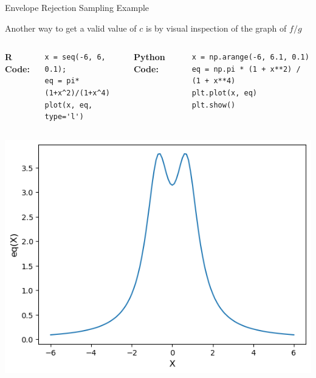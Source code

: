 \documentclass[8pt]{beamer}
\begin{document}
\begin{frame}[fragile]{Envelope Rejection Sampling Example}

Another way to get a valid value of $c$ is by visual inspection of the graph of $f/g$

\vspace{2mm}

\begin{columns}
{\bf R Code:}
\begin{lstlisting}
x = seq(-6, 6, 0.1);
eq = pi*(1+x^2)/(1+x^4)
plot(x, eq, type='l')
\end{lstlisting}

{\bf Python Code:}
\begin{lstlisting}
x = np.arange(-6, 6.1, 0.1)
eq = np.pi * (1 + x**2) / (1 + x**4)
plt.plot(x, eq)
plt.show()
\end{lstlisting}
\end{columns}

\begin{center}
\includegraphics[scale=0.45]{chapter1-part3-plot3.png}
\end{center}
\end{frame}
\end{document}
